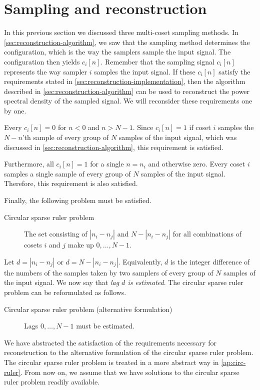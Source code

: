 \documentclass[a4paper, openany, oneside]{memoir}
\begin{document}
\section{Sampling and reconstruction}
In this previous section we discussed three multi-coset sampling methods. In \cref{sec:reconstruction-algorithm}, we saw that the sampling method determines the configuration, which is the way the samplers sample the input signal. The configuration then yields $c_i[n]$. Remember that the sampling signal $c_i[n]$ represents the way sampler $i$ samples the input signal. If these $c_i[n]$ satisfy the requirements stated in \cref{sec:reconstruction-implementation}, then the algorithm described in \cref{sec:reconstruction-algorithm} can be used to reconstruct the power spectral density of the sampled signal. We will reconsider these requirements one by one.

Every $c_i[n]=0$ for $n < 0$ and $n > N-1$. Since $c_i[n]=1$ if coset $i$ samples the $N-n$'th sample of every group of $N$ samples of the input signal, which was discussed in \cref{sec:reconstruction-algorithm}, this requirement is satisfied.

Furthermore, all $c_i[n]=1$ for a single $n=n_i$ and otherwise zero. Every coset $i$ samples a single sample of every group of $N$ samples of the input signal. Therefore, this requirement is also satisfied.

Finally, the following problem must be satisfied.

\begin{description}
    \item[Circular sparse ruler problem] The set consisting of $|n_i - n_j|$ and $N-|n_i-n_j|$ for all combinations of cosets $i$ and $j$ make up $0,\ldots,N-1$.
\end{description}

Let $d=|n_i - n_j|$ or $d=N-|n_i-n_j|$. Equivalently, $d$ is the integer difference of the numbers of the samples taken by two samplers of every group of $N$ samples of the input signal. We now say that \textit{lag $d$ is estimated}. The circular sparse ruler problem can be reformulated as follows.

\begin{description}
    \item[Circular sparse ruler problem (alternative formulation)] Lags $0,\ldots,N-1$ must be estimated.
\end{description}

We have abstracted the satisfaction of the requirements necessary for reconstruction to the alternative formulation of the circular sparse ruler problem. The circular sparse ruler problem is treated in a more abstract way in \cref{ap:circ-ruler}. From now on, we assume that we have solutions to the circular sparse ruler problem readily available.
\end{document}
